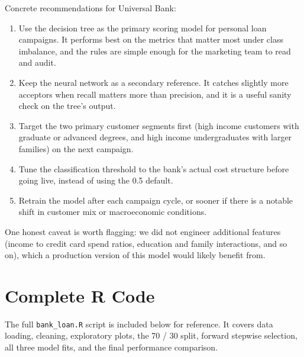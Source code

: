 \documentclass[11pt, a4paper]{article}
\begin{document}
Concrete recommendations for Universal Bank:

\begin{enumerate}[leftmargin=*, itemsep=4pt]
    \item Use the decision tree as the primary scoring model for personal
          loan campaigns. It performs best on the metrics that matter
          most under class imbalance, and the rules are simple enough for
          the marketing team to read and audit.
    \item Keep the neural network as a secondary reference. It catches
          slightly more acceptors when recall matters more than precision,
          and it is a useful sanity check on the tree's output.
    \item Target the two primary customer segments first (high income
          customers with graduate or advanced degrees, and high income
          undergraduates with larger families) on the next campaign.
    \item Tune the classification threshold to the bank's actual cost
          structure before going live, instead of using the 0.5 default.
    \item Retrain the model after each campaign cycle, or sooner if there
          is a notable shift in customer mix or macroeconomic conditions.
\end{enumerate}

One honest caveat is worth flagging: we did not engineer additional
features (income to credit card spend ratios, education and family
interactions, and so on), which a production version of this model would
likely benefit from.

\appendix
\section{Complete R Code}

The full \texttt{bank\_loan.R} script is included below for reference. It
covers data loading, cleaning, exploratory plots, the 70 / 30 split,
forward stepwise selection, all three model fits, and the final
performance comparison.


\end{document}

